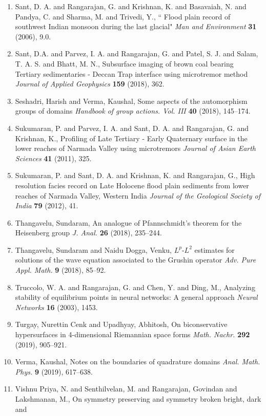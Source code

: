 \begin{enumerate}
\item Sant, D. A. and Rangarajan, G. and Krishnan, K. and Basavaiah, N. and Pandya, C. and Sharma, M. and Trivedi, Y., “ Flood plain record of southwest Indian monsoon during the last glacial" {\em Man and Environment} {\bf 31} (2006), 9.0.
\item Sant, D.A. and Parvez, I. A. and Rangarajan, G. and Patel, S. J. and Salam, T. A. S. and Bhatt, M. N., Subsurface imaging of brown coal bearing Tertiary sedimentaries - Deccan Trap interface using microtremor method {\em Journal of Applied Geophysics} {\bf 159} (2018), 362.
\item Seshadri, Harish and Verma, Kaushal, Some aspects of the automorphism groups of domains {\em Handbook of group actions. {V}ol. {III}} {\bf 40} (2018), 145--174.
\item Sukumaran, P. and Parvez, I. A. and Sant, D. A. and Rangarajan, G. and Krishnan, K., Profiling of Late Tertiary - Early Quaternary surface in the lower reaches of Narmada Valley using microtremors {\em Journal of Asian Earth Sciences} {\bf 41} (2011), 325.
\item Sukumaran, P. and Sant, D. A. and Krishnan, K. and Rangarajan, G., High resolution facies record on Late Holocene flood plain sediments from lower reaches of Narmada Valley, Western India {\em Journal of the Geological Society of India} {\bf 79} (2012), 41.
\item Thangavelu, Sundaram, An analogue of {P}fannschmidt's theorem for the {H}eisenberg
group {\em J. Anal.} {\bf 26} (2018), 235--244.
\item Thangavelu, Sundaram and Naidu Dogga, Venku, {$L^p$}-{$L^2$} estimates for solutions of the wave equation
associated to the {G}rushin operator {\em Adv. Pure Appl. Math.} {\bf 9} (2018), 85--92.
\item Truccolo, W. A. and Rangarajan, G. and Chen, Y. and Ding, M., Analyzing stability of equilibrium points in neural networks: A general approach {\em Neural Networks} {\bf 16} (2003), 1453.
\item Turgay, Nurettin Cenk and Upadhyay, Abhitosh, On biconservative hypersurfaces in 4-dimensional {R}iemannian
space forms {\em Math. Nachr.} {\bf 292} (2019), 905--921.
\item Verma, Kaushal, Notes on the boundaries of quadrature domains {\em Anal. Math. Phys.} {\bf 9} (2019), 617--638.
\item Vishnu Priya, N. and Senthilvelan, M. and Rangarajan, Govindan
and Lakshmanan, M., On symmetry preserving and symmetry broken bright, dark and

\end{enumerate}
